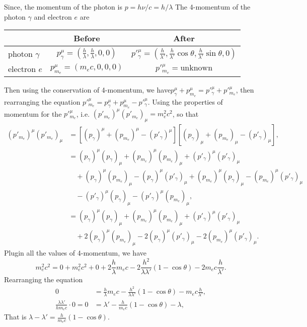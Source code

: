 \documentclass[12pt]{article}%
\begin{document}
\begin{enumerate}
{\begin{minipage}[c]{0.98\linewidth}
Since, the momentum of the photon is $p = h\nu/c = h/\lambda$
The 4-momentum of the photon $\gamma$ and electron $e$ are 
\begin{center}
\begin{tabular}{l|c|c}
	& Before & After\\\hline\hline
photon $\gamma$	
& $\displaystyle p_{\gamma}^{\mu} = \left(\frac{h}{\lambda}, \frac{h}{\lambda}, 0, 0\right)$ 
& $\displaystyle  p'^{\mu}_{\gamma} = \left(\frac{h}{\lambda'}, \frac{h}{\lambda'}\cos\theta, \frac{h}{\lambda'}\sin\theta, 0\right)$\\\hline
electron $e$	& $p^{\mu}_{m_e} = (m_e c, 0, 0, 0)$ & $p'^{\mu}_{m_e}=\text{unknown}$
\end{tabular}
\end{center}
Then using the conservation of 4-momentum, we have$p^{\mu}_{\gamma} + p^{\mu}_{m_e} = p'^{\mu}_{\gamma} + p'^{\mu}_{m_e}$, then rearranging the equation $p'^{\mu}_{m_e} = p^{\mu}_{\gamma} + p^{\mu}_{m_e} - p'^{\mu}_{\gamma}$.
Using the properties of momentum for the $p'^{\mu}_{m_e}$, i.e. $(p'_{m_e})^{\mu}(p'_{m_e})_{\mu} = m_e^2 c^2$, so that
\begin{align}
(p'_{m_e})^{\mu}(p'_{m_e})_{\mu} 
&= \left[(p_{\gamma})^{\mu} + (p_{m_e})^{\mu} - (p'_{\gamma})^{\mu}\right]
	\left[(p_{\gamma})_{\mu} + (p_{m_e})_{\mu} - (p'_{\gamma})_{\mu}\right],\\
&= (p_{\gamma})^{\mu} (p_{\gamma})_{\mu} 
	+ (p_{m_e})^{\mu} (p_{m_e})_{\mu}
	+ (p'_{\gamma})^{\mu} (p'_{\gamma})_{\mu}\\
&\quad +(p_{\gamma})^{\mu}(p_{m_e})_{\mu} - (p_{\gamma})^{\mu}(p'_{\gamma})_{\mu}
 +(p_{m_e})^{\mu}(p_{\gamma})_{\mu} - (p_{m_e})^{\mu}(p'_{\gamma})_{\mu}\\
&\quad -(p'_{\gamma})^{\mu}(p_{\gamma})_{\mu} - (p'_{\gamma})^{\mu}(p_{m_e})_{\mu},\\
&= (p_{\gamma})^{\mu} (p_{\gamma})_{\mu} 
	+ (p_{m_e})^{\mu} (p_{m_e})_{\mu}
	+ (p'_{\gamma})^{\mu} (p'_{\gamma})_{\mu}\\
&\quad +2(p_{\gamma})^{\mu}(p_{m_e})_{\mu} 
	- 2(p_{\gamma})^{\mu}(p'_{\gamma})_{\mu}
 	- 2(p_{m_e})^{\mu}(p'_{\gamma})_{\mu}.
\end{align}
Plugin all the values of 4-momentum, we have
\begin{equation}
m_e^2 c^2 
= 0 + m_e^2 c^2 + 0 + 2\frac{h}{\lambda} m_ec - 2\frac{h^2}{\lambda\lambda'}\left(1-\cos\theta\right) - 2m_ec\frac{h}{\lambda'}.
\end{equation}
Rearranging the equation
\begin{align}
0 &= \frac{h}{\lambda} m_ec - \frac{h^2}{\lambda\lambda'}\left(1-\cos\theta\right) - m_ec\frac{h}{\lambda'},\\
\frac{\lambda\lambda'}{hm_ec}\cdot 0 = 0 &= \lambda' - \frac{h}{m_ec}\left(1-\cos\theta\right) - \lambda,
\end{align}
That is $\displaystyle \lambda - \lambda' = \frac{h}{m_ec}\left(1-\cos\theta\right)$.







\end{minipage}}
\end{enumerate}
\end{document}

